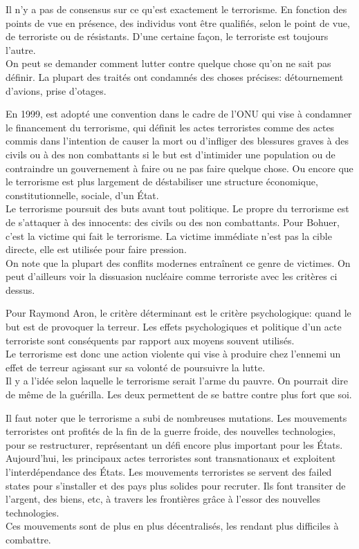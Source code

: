 \documentclass[10pt, a4paper, openany]{book}
\begin{document}
Il n'y a pas de consensus sur ce qu'est exactement le terrorisme. En fonction des points de vue en présence, des individus vont être qualifiés, selon le point de vue, de terroriste ou de résistants. D'une certaine façon, le terroriste est toujours l'autre. \\
On peut se demander comment lutter contre quelque chose qu'on ne sait pas définir. La plupart des traités ont condamnés des choses précises: détournement d'avions, prise d'otages.


En 1999, est adopté une convention dans le cadre de l'ONU qui vise à condamner le financement du terrorisme, qui définit les actes terroristes comme des actes commis dans l'intention de causer la mort ou d'infliger des blessures graves à des civils ou à des non combattants si le but est d'intimider une population ou de contraindre un gouvernement à faire ou ne pas faire quelque chose. Ou encore que le terrorisme est plus largement de déstabiliser une structure économique, constitutionnelle, sociale, d'un État. \\
Le terrorisme poursuit des buts avant tout politique. Le propre du terrorisme est de s'attaquer à des innocents: des civils ou des non combattants. Pour Bohuer, c'est la victime qui fait le terrorisme. La victime immédiate n'est pas la cible directe, elle est utilisée pour faire pression. \\
On note que la plupart des conflits modernes entraînent ce genre de victimes. On peut d'ailleurs voir la dissuasion nucléaire comme terroriste avec les critères ci dessus.


Pour Raymond Aron, le critère déterminant est le critère psychologique: quand le but est de provoquer la terreur. Les effets psychologiques et politique d'un acte terroriste sont conséquents par rapport aux moyens souvent utilisés. \\
Le terrorisme est donc une action violente qui vise à produire chez l'ennemi un effet de terreur agissant sur sa volonté de poursuivre la lutte. \\
Il y a l'idée selon laquelle le terrorisme serait l'arme du pauvre. On pourrait dire de même de la guérilla. Les deux permettent de se battre contre plus fort que soi. 


Il faut noter que le terrorisme a subi de nombreuses mutations. Les mouvements terroristes ont profités de la fin de la guerre froide, des nouvelles technologies, pour se restructurer, représentant un défi encore plus important pour les États.\\
Aujourd'hui, les principaux actes terroristes sont transnationaux et exploitent l'interdépendance des États. Les mouvements terroristes se servent des failed states pour s'installer et des pays plus solides pour recruter. Ils font transiter de l'argent, des biens, etc, à travers les frontières grâce à l'essor des nouvelles technologies. \\
Ces mouvements sont de plus en plus décentralisés, les rendant plus difficiles à combattre.
\end{document}
